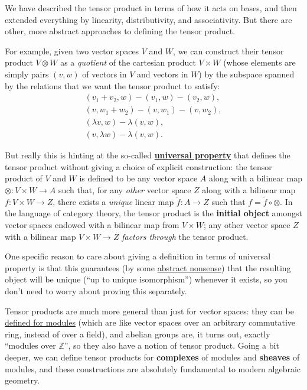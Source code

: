 \documentclass[fleqn]{article}
\newenvironment{technical}{\noindent}{\medskip}
\begin{document}
\begin{technical}
We have described the tensor product in terms of how it acts on bases, and then extended everything by linearity, distributivity, and associativity.
But there are other, more abstract approaches to defining the tensor product.

For example, given two vector spaces \(V\) and \(W\), we can construct their tensor product \(V\otimes W\) as a \emph{quotient} of the cartesian product \(V\times W\) (whose elements are simply pairs \((v,w)\) of vectors in \(V\) and vectors in \(W\)) by the subspace spanned by the relations that we want the tensor product to satisfy:
\[
  \begin{gathered}
    (v_1+v_2,w)-(v_1,w)-(v_2,w),
  \\(v,w_1+w_2)-(v,w_1)-(v,w_2),
  \\(\lambda v,w)-\lambda(v,w),
  \\(v,\lambda w)-\lambda(v,w).
  \end{gathered}
\]

But really this is hinting at the so-called \href{https://en.wikipedia.org/wiki/Universal_property}{\textbf{universal property}} that defines the tensor product without giving a choice of explicit construction: the tensor product of \(V\) and \(W\) is defined to be any vector space \(A\) along with a bilinear map \(\otimes\colon V\times W\to A\) such that, for any \emph{other} vector space \(Z\) along with a bilinear map \(f\colon V\times W\to Z\), there exists a \emph{unique} linear map \(\tilde{f}\colon A\to Z\) such that \(f=\tilde{f}\circ\otimes\).
In the language of category theory, the tensor product is the \textbf{initial object} amongst vector spaces endowed with a bilinear map from \(V\times W\); any other vector space \(Z\) with a bilinear map \(V\times W\to Z\) \emph{factors through} the tensor product.

One specific reason to care about giving a definition in terms of universal property is that this guarantees (by some \href{https://en.wikipedia.org/wiki/Abstract_nonsense}{abstract nonsense}) that the resulting object will be unique (``up to unique isomorphism'') whenever it exists, so you don't need to worry about proving this separately.

Tensor products are much more general than just for vector spaces: they can be \href{https://en.wikipedia.org/wiki/Tensor_product_of_modules}{defined for modules} (which are like vector spaces over an arbitrary commutative ring, instead of over a field), and abelian groups are, it turns out, exactly ``modules over \(\mathbb{Z}\)'', so they also have a notion of tensor product.
Going a bit deeper, we can define tensor products for \textbf{complexes} of modules and \textbf{sheaves} of modules, and these constructions are absolutely fundamental to modern algebraic geometry.


\end{technical}
\end{document}
